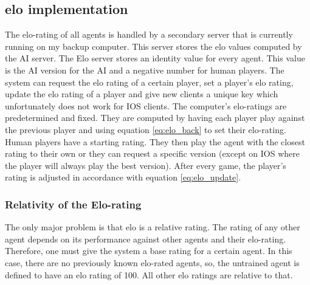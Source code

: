 \documentclass[12pt]{article}
\begin{document}
\subsection{elo implementation}
The elo-rating of all agents is handled by a secondary server that is currently running on my backup computer. This server stores the elo values computed by the AI server. The Elo server stores an identity value for every agent. This value is the AI version for the AI and a negative number for human players. The system can request the elo rating of a certain player, set a player's elo rating, update the elo rating of a player and give new clients a unique key which unfortunately does not work for IOS clients. The computer's elo-ratings are predetermined and fixed. They are computed by having each player play against the previous player and using equation \ref{eq:elo_back} to set their elo-rating. Human players have a starting rating. They then play the agent with the closest rating to their own or they can request a specific version (except on IOS where the player will always play the best version). After every game, the player's rating is adjusted in accordance with equation \ref{eq:elo_update}.
\subsubsection{Relativity of the Elo-rating}
The only major problem is that elo is a relative rating. The rating of any other agent depends on its performance against other agents and their elo-rating. Therefore, one must give the system a base rating for a certain agent. In this case, there are no previously known elo-rated agents, so, the untrained agent is defined to have an elo rating of 100. All other elo ratings are relative to that.
\end{document}
